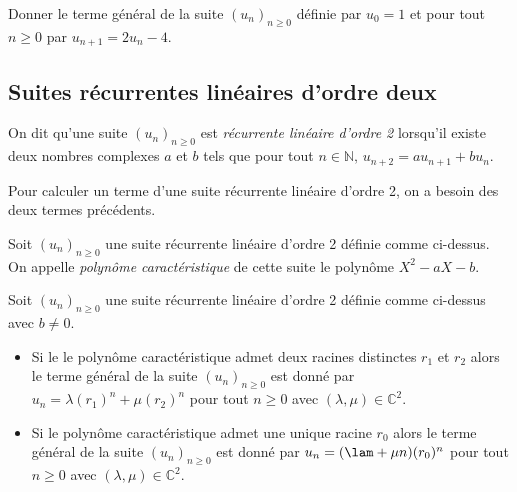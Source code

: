 \documentclass[a4paper,10pt]{report}
\begin{document}
\begin{exa} Donner le terme général de la suite $(u_n)_{n \geq 0}$ définie par $u_0=1$ et pour tout $n \geq 0$ par $u_{n+1} =  2u_n - 4$. \end{exa}

\subsection{Suites récurrentes linéaires d'ordre deux}

\begin{defin}
On dit qu'une suite $(u_n)_{n \geq 0}$ est \textit{récurrente linéaire d'ordre 2} lorsqu'il existe deux nombres complexes $a$ et $b$ tels que pour tout $n \in \mathbb{N}, \, u_{n+2} = a u_{n+1}+b u_n$.
\end{defin}

\begin{rem} Pour calculer un terme d'une suite récurrente linéaire d'ordre 2, on a besoin des deux termes précédents. 
\end{rem} 

\begin{defin}
Soit $(u_n)_{n \geq 0}$ une suite récurrente linéaire d'ordre 2 définie comme ci-dessus.\\
On appelle \textit{polynôme caractéristique} de cette suite le polynôme $X^2-aX-b$.
\end{defin}

\begin{thm}
Soit $(u_n)_{n \geq 0}$ une suite récurrente linéaire d'ordre 2 définie comme ci-dessus avec $b \neq 0.$
\begin{itemize}
\item Si le le polynôme caractéristique admet deux racines distinctes $r_1$ et $r_2$ alors le terme général de la suite $(u_n)_{n \geq 0}$ est donné par $u_n=\lambda (r_1)^n+\mu (r_2)^n$ pour tout $n \geq 0$ avec $(\lambda,\mu) \in \mathbb{C}^2$.
\item Si le polynôme caractéristique admet une unique racine $r_0$ alors le terme général de la suite $(u_n)_{n \geq 0}$ est donné par $u_n= (\lam+\mu n)(r_0)^n$ pour tout $n \geq 0$ avec $(\lambda,\mu) \in \mathbb{C}^2$.
\end{itemize}
\end{thm}
\end{document}
